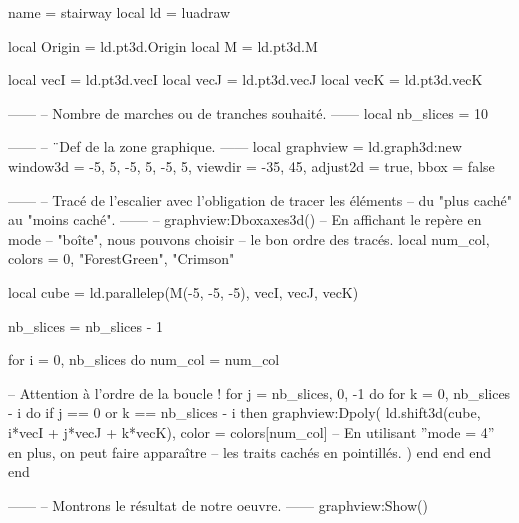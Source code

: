 \documentclass[border = 3pt]{standalone}
\begin{document}
\begin{luadraw*}{name = stairway}
local ld = luadraw

local Origin = ld.pt3d.Origin
local M      = ld.pt3d.M

local vecI = ld.pt3d.vecI
local vecJ = ld.pt3d.vecJ
local vecK = ld.pt3d.vecK

------
-- Nombre de marches ou de tranches souhaité.
------
local nb_slices = 10

------
-- ¨Def de la zone graphique.
------
local graphview = ld.graph3d:new{
  window3d = {-5, 5, -5, 5, -5, 5},
  viewdir  = {-35, 45},
  adjust2d = true,
  bbox     = false
}

------
-- Tracé de l'escalier avec l'obligation de tracer les éléments
-- du "plus caché" au "moins caché".
------
-- graphview:Dboxaxes3d()  -- En affichant le repère en mode
                        -- "boîte", nous pouvons choisir
                        -- le bon ordre des tracés.
local num_col, colors = 0, {"ForestGreen", "Crimson"}

local cube = ld.parallelep(M(-5, -5, -5), vecI, vecJ, vecK)

nb_slices = nb_slices - 1

for i = 0, nb_slices do
  num_col = num_col%

-- Attention à l'ordre de la boucle !
  for j = nb_slices, 0, -1 do
    for k = 0, nb_slices - i do
      if j == 0 or k == nb_slices - i then
        graphview:Dpoly(
          ld.shift3d(cube, i*vecI + j*vecJ + k*vecK),
          {
            color = colors[num_col]
-- En utilisant ''mode = 4'' en plus, on peut faire apparaître
-- les traits cachés en pointillés.
          }
        )
      end
    end
  end
end

------
-- Montrons le résultat de notre oeuvre.
------
graphview:Show()
\end{luadraw*}
\end{document}
